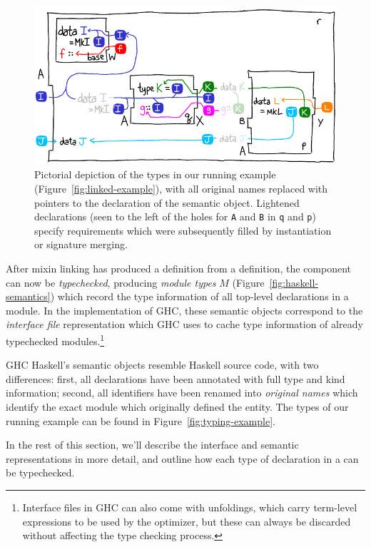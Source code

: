 \begin{figure}
\center\includegraphics{figures/pqr-type-diagram.pdf}
\caption{Pictorial depiction of the types in our running example
(Figure~\ref{fig:linked-example}), with all original names replaced with
pointers to the declaration of the semantic object.
Lightened declarations (seen to the left of the holes for \texttt{A} and
\texttt{B} in \texttt{q} and \texttt{p}) specify requirements which
were subsequently filled by instantiation or signature merging.}
\label{fig:typing-example-diagram}
\end{figure}

After mixin linking has produced a \unit{} definition from a \ccomp{}
definition, the component can now be \emph{typechecked}, producing \emph{module types} $M$
(Figure~\ref{fig:haskell-semantics}) which record the type information
of all top-level declarations in a module.  In the implementation
of GHC, these semantic objects correspond to the \emph{interface
file} representation which GHC uses to cache type information of
already typechecked modules.\footnote{Interface files in GHC can also come with unfoldings,
which carry term-level expressions to be used by the optimizer, but
these can always be discarded without affecting the type checking
process.}

GHC Haskell's semantic objects resemble Haskell source code,
with two differences:
first, all declarations have been annotated with full type and kind
information; second, all identifiers have been renamed into \emph{original
names} which identify the exact module which originally defined the
entity.  The types of our running example can be found
in Figure~\ref{fig:typing-example}.

In the rest of this section, we'll describe the interface and semantic
representations in more detail, and outline how each type of declaration
in a \unit{} can be typechecked.

